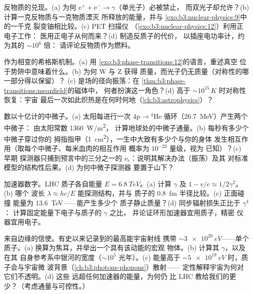 \begin{exercise}[$\star\star$]\label{exo:b3:particle-physics:8}
反物质的兑现。(a) 为何
$\text{e}^+ + \text{e}^- \to \gamma$（单光子）必被禁止，
而双光子却允许？(b) 计算一克反物质与一克物质湮灭
所释放的能量，并与
\cref{exo:b3:nuclear-physics:9}中的一千克
裂变铀相比较。(c) PET 扫描仪
（\cref{exo:b3:nuclear-physics:12}）利用正电子工作：
医用正电子从何而来？(d) 制造反质子的代价，
以插座电功率计，约为其的 $\sim10^{6}$ 倍：
请评论反物质作为燃料。
\end{exercise}

\begin{exercise}[$\star\star\star$]\label{exo:b3:particle-physics:9}
作为相变的希格斯机制。(a) 用
\cref{exo:b3:phase-transitions:12}的语言，重述真空
位于势阱中意味着什么。(b) 为何 W 与 Z 获得
质量，而光子仍无质量（对称性的哪一部分得以保留）？
(c) 是场的径向振荡：在
\cref{thm:b3:phase-transitions:meanfield}的磁体中，
何者扮演这一角色？(d) 高于
$\sim10^{15}\,\unit{K}$ 时对称性恢复：宇宙
最后一次如此炽热是在何时何地（\cref{ch:b3:astrophysics}）？
\end{exercise}

\begin{exercise}[$\star\star\star$]\label{exo:b3:particle-physics:10}
数以十亿计的中微子。(a) 太阳每进行一次
$4\text{p} \to {}^4\text{He}$ 循环（\qty{26.7}{MeV}）产生两个中微子：
由太阳常数 \qty{1360}{W/m^2}，
计算地球处的中微子通量。(b) 每秒有多少个中微子穿过你的
拇指指甲（\qty{1}{cm^2}），一生中大致有多少个与你的身体
发生相互作用（取每个中微子、每米血肉的相互作用
概率为 $10^{-22}$ 量级，视为
已知）？(c) 早期
探测器只捕到预言中的三分之一的
$\nu_{\text{e}}$：说明其解决办法（振荡）及其
对标准模型的结构性后果。(d) 为何中微子探测器
要置于山下？
\end{exercise}

\begin{exercise}[$\star\star\star$]\label{exo:b3:particle-physics:11}
加速器数字。LHC 质子各自能量 $E = \qty{6.8}{TeV}$。(a)
计算 $\gamma$ 及 $1 - v/c \approx 1/2\gamma^2$。(b) 哪个
波长 $\lambda \approx hc/E$ 能探测结构，并与
质子的 \qty{0.8}{fm} 半径比较。(c) 正面碰撞
能量为 \qty{13.6}{TeV}——能产生多少个
质子静止质量？(d) 同步辐射损失正比于 $\gamma^4$：
计算固定能量下电子与质子的 $\gamma$ 之比，
并论证环形加速器宜用质子，精密
仪器宜用电子。
\end{exercise}

\begin{exercise}[$\star\star\star$]\label{exo:b3:particle-physics:12}
来自边缘的信使。有史以来记录到的最高能宇宙射线
携带 $\sim\qty{3e20}{eV}$——单个质子。(a)
换算为焦耳，并举出一个具有该动能的宏观
物体。(b) 计算其 $\gamma$，以及在其
自身参考系中银河的宽度（$\sim10^{5}$ 光年）。(c)
能量高于 $\sim\qty{5e19}{eV}$ 时，质子会与宇宙微
波背景（\cref{ch:b3:photons-phonons}）散射——
定性解释宇宙为何对它们不透明。(d) 这些
远超任何加速器的能量，为何仍
比 LHC 教给我们的更少？（考虑通量与可控性。）
\end{exercise}


